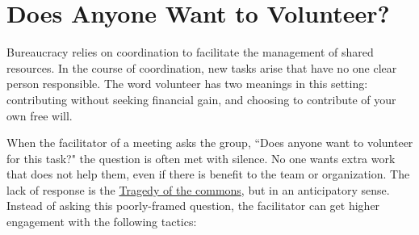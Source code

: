 \section{Does Anyone Want to Volunteer?}

Bureaucracy relies on coordination to facilitate the management of shared resources. In the course of coordination, new tasks arise that have no one clear person responsible. The word volunteer has two meanings in this setting: contributing without seeking financial gain, and choosing to contribute of your own free will. 


When the facilitator of a meeting asks the group, ``Does anyone want to volunteer for this task?" the question is often met with silence. No one wants extra work that does not help them, even if there is benefit to the team or organization. 
The lack of response is the \href{https://en.wikipedia.org/wiki/Tragedy_of_the_commons}{Tragedy of the commons}, 
but in an anticipatory sense.
Instead of asking this poorly-framed question, the facilitator can get higher engagement with the following tactics:
